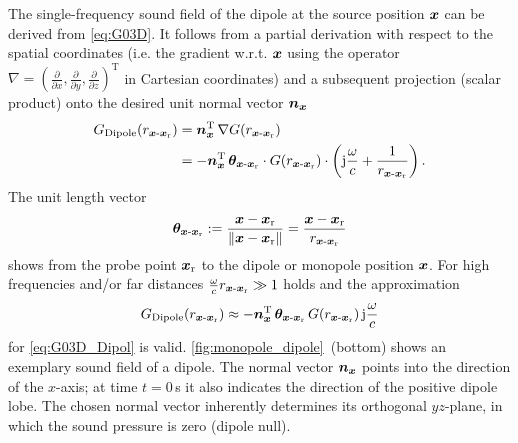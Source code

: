 The single-frequency sound field of the dipole at the source position $\bm{x}$ can
be derived from \myeq\eqref{eq:G03D}.
%
It follows from a partial derivation with respect to the spatial coordinates
(i.e. the gradient w.r.t. $\bm{x}$ using the operator
$\nabla = (
\frac{\partial}{\partial x},
\frac{\partial}{\partial y},
\frac{\partial}{\partial z}
)^\mathrm{T}$
in Cartesian coordinates) and a subsequent projection (scalar product) onto
the desired unit normal vector $\bm{n}_{\bm{x}}$
%
\begin{align}
\label{eq:G03D_Dipol}
G_\text{Dipole}(r_{\xs\text{-}\xr}) &=
\nxT \, \nabla G(r_{\xs\text{-}\xr}) \nonumber\\
&= -\nxT\,\bm{\theta}_{\xs\text{-}\xr}\cdot
G(r_{\xs\text{-}\xr}) \cdot \left(\im\wc +\frac{1}{r_{\xs\text{-}\xr}}\right).
\end{align}
%
%
The unit length vector
\begin{align}
\bm{\theta}_{\bm{x}\text{-}\bm{x}_\mathrm{r}} :=
\frac{\bm{x}-\bm{x}_\mathrm{r}}{\|\bm{x}-\bm{x}_\mathrm{r}\|}  =
\frac{\bm{x}-\bm{x}_\mathrm{r}}{r_{\bm{x}\text{-}\bm{x}_\mathrm{r}}}
\end{align}
shows from the probe point $\bm{x}_\mathrm{r}$ to the dipole or monopole position $\bm{x}$.
%
For high frequencies and/or far distances
$\frac{\omega}{c} r_{\bm{x}\text{-}\bm{x}_\mathrm{r}} \gg 1$ holds and the approximation
%
\begin{align}
\label{eq:DipolHF}
G_\text{Dipole}(r_{\xs\text{-}\xr}) \approx
-\nxT\,\bm{\theta}_{\xs\text{-}\xr}\,
G(r_{\xs\text{-}\xr}) \, \im\wc
\end{align}
%
for \eqref{eq:G03D_Dipol} is valid.
%
\myfig\ref{fig:monopole_dipole}~(bottom) shows an exemplary sound field
of a dipole.
%
The normal vector $\bm{n}_{\bm{x}}$ points into the direction of the $x$-axis;
at time $t=0$\,s it also indicates the direction of the positive dipole lobe.
%
The chosen normal vector inherently determines its orthogonal $yz$-plane,
in which the sound pressure is zero (dipole null).



